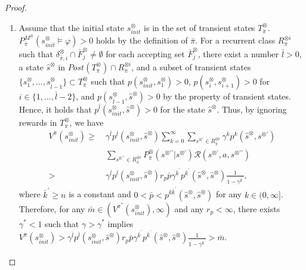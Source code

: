 \documentclass[letterpaper, 10 pt, conference]{ieeeconf}  %
\begin{document}
\begin{proof}
\begin{enumerate}
    \item Assume that the initial state $s^{\otimes}_{init}$ is in the set of transient states $T_{\bar{\pi}}^{\otimes}$.
    $P^{M^{\otimes}}_{\bar{\pi}}(s^{\otimes}_{init} \models \varphi) > 0$ holds by the definition of $\bar{\pi}$. For a recurrent class $R^{\otimes i}_{\bar{\pi}}$ such that $\delta^{\otimes}_{\bar{\pi}, i} \cap \bar{F}^{\otimes}_j \neq \emptyset$ for each accepting set
    $\bar{F}^{\otimes}_j$, there exist a number $\bar{l} > 0$, a state $\hat{s}^{\otimes}$ in $Post(T^{\otimes}_{\bar{\pi}}) \cap R^{\otimes i}_{\bar{\pi}}$, and a subset of transient states $\{ s^{\otimes}_1, \ldots , s^{\otimes}_{\bar{l}-1} \} \subset T^\otimes_{\bar{\pi}}$ such that $p(s^{\otimes}_{init}, s^{\otimes}_1)>0$, $p(s^{\otimes}_{i}, s^{\otimes}_{i+1})>0$ for $i \in \{ 1,...,\bar{l}-2 \}$, and $p(s^{\otimes}_{\bar{l}-1}, \hat{s}^{\otimes})>0$ by the property of transient states.
    Hence, it holds that $p^{\bar{l}}(s^{\otimes}_{init}, \hat{s}^{\otimes}) > 0$ for the state $\hat{s}^{\otimes}$. Thus, by ignoring rewards in $T^{\otimes}_{\bar{\pi}}$, we have
     \begin{align}
        V^{\bar{\pi}}(s^{\otimes}_{init}) %
        \geq\ & \gamma^{\bar{l}} p^{\bar{l}}(s^{\otimes}_{init}, \hat{s}^{\otimes}) \sum_{k=0}^{\infty} \sum_{s^{\otimes \prime} \in R^{\otimes i}_{\bar{\pi}}} \gamma^k p^k(\hat{s}^{\otimes}, s^{\otimes \prime}) \nonumber \\
        & \sum_{s^{\otimes \prime \prime} \in R^{\otimes i}_{\bar{\pi}}} P^{\otimes}_{\bar{\pi}}(s^{\otimes \prime \prime} | s^{\otimes \prime}) \mathcal{R}(s^{\otimes \prime}, a, s^{\otimes \prime \prime}) \nonumber \\
        >\ & \gamma^{\bar{l}} p^{\bar{l}}(s^{\otimes}_{init}, \hat{s}^{\otimes}) r_p \bar{p} \gamma^{\bar{k}^{\prime}}  p^{\bar{k}^{\prime}}(\hat{s}^{\otimes},\hat{s}^{\otimes}) \frac{1}{ 1 - \gamma^{\bar{k}^{\prime}} }, \nonumber
     \end{align}
     where $\bar{k}^{\prime}  \geq n$ is a constant and $0<\bar{p}< p^{k \bar{k}^{\prime}}(\hat{s}^{\otimes}, \hat{s}^{\otimes})$ for any $k \in (0, \infty]$.
     Therefore, for any $\bar{m} \in (V^{\pi^{\ast}}(s^{\otimes}_{init}), \infty)$ and any $r_p < \infty$, there exists $\gamma^{\ast}<1$ such that $\gamma > \gamma^{\ast}$ implies
     $V^{\bar{\pi}}(s^{\otimes}_{init}) > \gamma^{\bar{l}} p^{\bar{l}}(s^{\otimes}_{init}, \hat{s}^{\otimes}) r_p \bar{p} \gamma^{\bar{k}^{\prime}} p^{\bar{k}^{\prime}}(\hat{s}^{\otimes},\hat{s}^{\otimes}) \frac{1}{ 1 - \gamma^{\bar{k}^{\prime}} } > \bar{m}$.
  \end{enumerate}


\end{proof}
\end{document}
